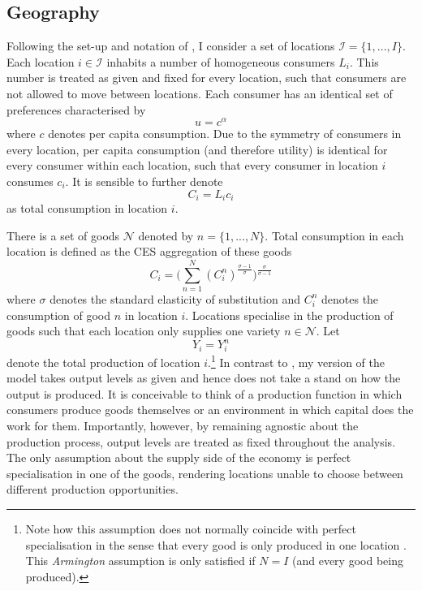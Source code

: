 \documentclass[11pt, oneside]{article}   	%
\begin{document}
\subsection{Geography}

Following the set-up and notation of \cite{fajgelbaum_optimal_2017}, I consider a set of locations $\mathcal{I} =\{ 1,...,I\}$. Each location $i \in \mathcal{I}$ inhabits a number of homogeneous consumers $L_{i}$. This number is treated as given and fixed for every location, such that consumers are not allowed to move between locations. Each consumer has an identical set of preferences characterised by
\begin{equation*}
  u = c^{\alpha}
\end{equation*}
where $c$ denotes per capita consumption. Due to the symmetry of consumers in every location, per capita consumption (and therefore utility) is identical for every consumer within each location, such that every consumer in location $i$ consumes $c_{i}$. It is sensible to further denote
\begin{equation*}
  C_{i} = L_{i}c_{i}
\end{equation*}
as total consumption in location $i$.

There is a set of goods $\mathcal{N}$ denoted by $n =\{ 1,...,N\}$. Total consumption in each location is defined as the CES aggregation of these goods
\begin{equation*}
  C_{i} = \bigg( \sum_{n=1}^{N} (C_{i}^{n})^{\frac{\sigma-1}{\sigma}}\bigg)^{\frac{\sigma}{\sigma-1}}
\end{equation*}
where $\sigma$ denotes the standard elasticity of substitution and $C_{i}^{n}$ denotes the consumption of good $n$ in location $i$. Locations specialise in the production of goods such that each location only supplies one variety $n \in \mathcal{N}$. Let
\begin{equation*}
  Y_{i} = Y_{i}^{n}
\end{equation*}
denote the total production of location $i$.\footnote{Note how this assumption does not normally coincide with perfect specialisation in the sense that every good is only produced in one location \citep[as in e.g.][]{Anderson_Gravitygravitassolution_2003}. This \emph{Armington} assumption is only satisfied if $N=I$ (and every good being produced).} In contrast to \citeauthor{fajgelbaum_optimal_2017}, my version of the model takes output levels as given and hence does not take a stand on how the output is produced. It is conceivable to think of a production function in which consumers produce goods themselves or an environment in which capital does the work for them. Importantly, however, by remaining agnostic about the production process, output levels are treated as fixed throughout the analysis. The only assumption about the supply side of the economy is perfect specialisation in one of the goods, rendering locations unable to choose between different production opportunities.
\end{document}

